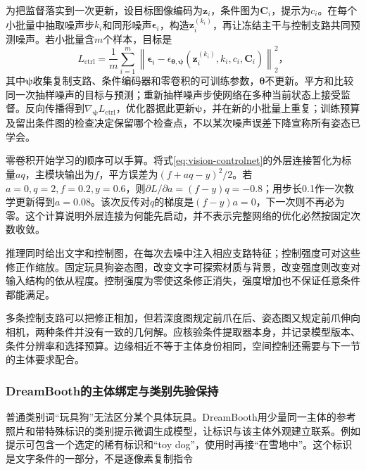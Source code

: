 为把监督落实到一次更新，设目标图像编码为$\bm{z}_i$，条件图为$\bm{C}_i$，提示为$c_i$。在每个小批量中抽取噪声步$k_i$和同形噪声$\bm{\epsilon}_i$，构造$\bm{z}_i^{(k_i)}$，再让冻结主干与控制支路共同预测噪声。若小批量含$m$个样本，目标是
\begin{equation}
 L_{\mathrm{ctrl}}=
 \frac{1}{m}\sum_{i=1}^{m}
 \left\lVert\bm{\epsilon}_i-
 \epsilon_{\bm{\theta},\bm{\psi}}
  (\bm{z}_i^{(k_i)},k_i,c_i,\bm{C}_i)
 \right\rVert_2^2\text{，}
 \label{eq:vision-controlnet-training}
\end{equation}
其中$\bm{\psi}$收集复制支路、条件编码器和零卷积的可训练参数，$\bm{\theta}$不更新。平方和比较同一次抽样噪声的目标与预测；重新抽样噪声步使网络在多种当前状态上接受监督。反向传播得到$\nabla_{\bm{\psi}}L_{\mathrm{ctrl}}$，优化器据此更新$\bm{\psi}$，并在新的小批量上重复；训练预算及留出条件图的检查决定保留哪个检查点，不以某次噪声误差下降宣称所有姿态已学会。

零卷积开始学习的顺序可以手算。将式\eqref{eq:vision-controlnet}的外层连接暂化为标量$a q$，主模块输出为$f$，平方误差为$(f+a q-y)^2/2$。若$a=0,q=2,f=0.2,y=0.6$，则$\partial L/\partial a=(f-y)q=-0.8$；用步长0.1作一次教学更新得到$a=0.08$。该次反传对$q$的梯度是$(f-y)a=0$，下一次则不再必为零。这个计算说明外层连接为何能先启动，并不表示完整网络的优化必然按固定次数收敛。

推理同时给出文字和控制图，在每次去噪中注入相应支路特征；控制强度可对这些修正作缩放。固定玩具狗姿态图，改变文字可探索材质与背景，改变强度则改变对输入结构的依从程度。控制强度为零使这条修正消失，强度增加也不保证任意条件都能满足。

多条控制支路可以把修正相加，但若深度图规定前爪在后、姿态图又规定前爪伸向相机，两种条件并没有一致的几何解。应核验条件提取器本身，并记录模型版本、条件分辨率和选择预算。边缘相近不等于主体身份相同，空间控制还需要与下一节的主体要求配合。

\subsubsection{DreamBooth的主体绑定与类别先验保持}
\label{sec:vision-generation-dreambooth}

普通类别词“玩具狗”无法区分某个具体玩具。DreamBooth用少量同一主体的参考照片和带特殊标识的类别提示微调生成模型，让标识与该主体外观建立联系。例如提示可包含一个选定的稀有标识和“toy dog”，使用时再接“在雪地中”。这个标识是文字条件的一部分，不是逐像素复制指令

